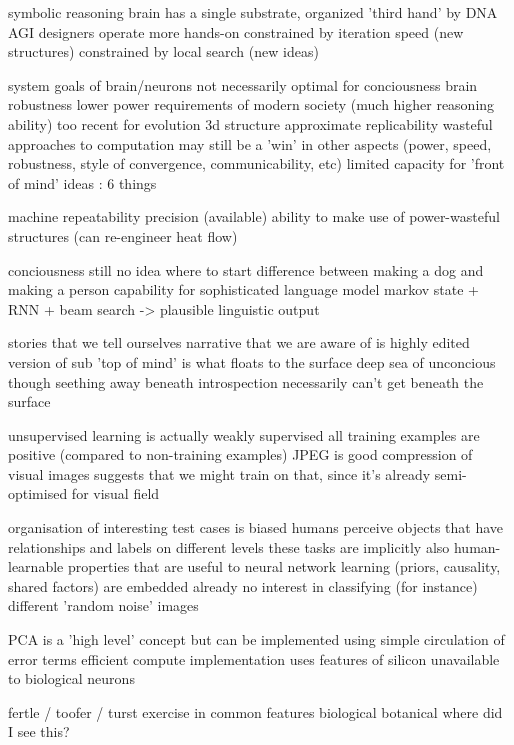 \documentclass{llncs}
\begin{document}
  symbolic reasoning
    brain has a single substrate, organized 'third hand' by DNA
    AGI designers operate more hands-on
      constrained by iteration speed (new structures)
      constrained by local search (new ideas)


system goals of brain/neurons not necessarily optimal for conciousness
  brain 
    robustness
    lower power
    requirements of modern society (much higher reasoning ability) too recent for evolution
    3d structure
    approximate replicability
    wasteful approaches to computation may still be a 'win' in other aspects 
      (power, speed, robustness, style of convergence, communicability, etc)
    limited capacity for 'front of mind' ideas : 6 things
    
  machine
    repeatability
    precision (available)
    ability to make use of power-wasteful structures (can re-engineer heat flow)
    

conciousness
  still no idea where to start
  difference between making a dog and making a person
    capability for sophisticated language model
      markov state + RNN + beam search -> plausible linguistic output
  
  stories that we tell ourselves
    narrative that we are aware of is highly edited version of sub
      'top of mind' is what floats to the surface
      deep sea of unconcious though seething away beneath
  introspection necessarily can't get beneath the surface

unsupervised learning is actually weakly supervised 
  all training examples are positive (compared to non-training examples)
  JPEG is good compression of visual images
    suggests that we might train on that, since it's already semi-optimised for visual field

organisation of interesting test cases is biased
  humans perceive objects that have relationships and labels on different levels
    these tasks are implicitly also human-learnable
    properties that are useful to neural network learning (priors, causality, shared factors) are embedded already
  no interest in classifying (for instance) different 'random noise' images

PCA is a 'high level' concept
  but can be implemented using simple circulation of error terms
  efficient compute implementation uses features of silicon unavailable to biological neurons


fertle / toofer / turst exercise in common features biological botanical
  where did I see this?
  
\end{document}
